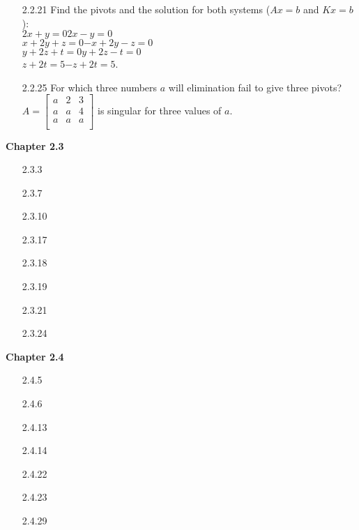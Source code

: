 \documentclass[10pt,twoside,reqno]{article}
\begin{document}
\begin{enumerate}
\item[2.2.21]Find the pivots and the solution for both systems ($Ax = b$ and $Kx = b$): \\
\hspace{122pt}$2x+ y      =0$\hspace{60pt}$2x- y      =0$\\
\hspace{105pt}$ x+2y+ z   =0$\hspace{35pt}$-x+2y- z   =0$\\
\hspace{107pt}$    y+2z+ t=0$\hspace{46pt}$    y+2z- t=0$\\
\hspace{125pt}$       z+2t=5$\hspace{55pt}$     - z+2t=5$.\\
\vspace{3mm}
\item[2.2.25]For which three numbers $a$ will elimination fail to give three pivots? \\
\vspace{3mm}
\hspace{95pt}
$
$$
A=
\begin{bmatrix}
a&2&3\\
a&a&4\\
a&a&a\\
\end{bmatrix}
$$
$
is singular for three values of $a$.
\vspace{3mm}
\end{enumerate}
\vspace{5mm}
\textbf{Chapter 2.3}
\begin{enumerate}
\item[2.3.3]
\item[2.3.7]
\item[2.3.10]
\item[2.3.17]
\item[2.3.18]
\item[2.3.19]
\item[2.3.21]
\item[2.3.24]
\end{enumerate}
\vspace{5mm}
\textbf{Chapter 2.4}
\begin{enumerate}
\item[2.4.5]
\item[2.4.6]
\item[2.4.13]
\item[2.4.14]
\item[2.4.22]
\item[2.4.23]
\item[2.4.29]
\end{enumerate}
\end{document}

